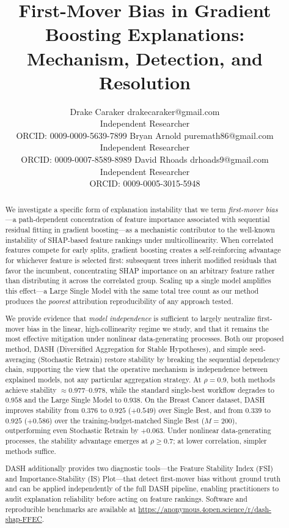 \documentclass[10pt]{article}
\title{First-Mover Bias in Gradient Boosting Explanations: Mechanism, Detection, and Resolution}
\author{\name Drake Caraker \email drakecaraker@gmail.com \\
      \addr Independent Researcher \\
      ORCID: 0009-0009-5639-7899
      \AND
      \name Bryan Arnold \email puremath86@gmail.com \\
      \addr Independent Researcher \\
      ORCID: 0009-0007-8589-8989
      \AND
      \name David Rhoads \email drhoads9@gmail.com \\
      \addr Independent Researcher \\
      ORCID: 0009-0005-3015-5948}
\newcommand{\dash}{\textsc{DASH}}
\newcommand{\rhovar}{\rho}
\begin{document}
\maketitle

\begin{abstract}
We investigate a specific form of explanation instability that we term
\emph{first-mover bias}---a path-dependent concentration of feature importance
associated with sequential residual fitting in gradient boosting---as a
mechanistic contributor to the well-known instability of SHAP-based feature
rankings under multicollinearity. When correlated features
compete for early splits, gradient boosting creates a self-reinforcing
advantage for whichever feature is selected first: subsequent trees inherit
modified residuals that favor the incumbent, concentrating SHAP importance on
an arbitrary feature rather than distributing it across the correlated group.
Scaling up a single model amplifies this effect---a Large Single Model with
the same total tree count as our method produces the \emph{poorest} attribution
reproducibility of any approach tested.

We provide evidence that \emph{model independence} is sufficient to largely
neutralize first-mover bias in the linear, high-collinearity regime we study,
and that it remains the most effective mitigation under nonlinear
data-generating processes. Both our proposed
method, \dash{} (Diversified Aggregation for Stable Hypotheses), and simple seed-averaging
(Stochastic Retrain) restore stability by breaking the sequential dependency
chain, supporting the view that the operative mechanism is independence between
explained models, not any particular aggregation strategy. At $\rhovar = 0.9$, both methods achieve stability
$\approx 0.977$--$0.978$, while the standard
single-best workflow degrades to $0.958$ and the Large Single Model to
$0.938$. On the Breast Cancer dataset, \dash{} improves stability from
$0.376$ to $0.925$ ($+0.549$) over Single Best, and from
$0.339$ to $0.925$ ($+0.586$) over the training-budget-matched
Single Best ($M{=}200$), outperforming even Stochastic Retrain by $+0.063$.
Under nonlinear data-generating processes, the stability advantage
emerges at $\rhovar \geq 0.7$; at lower correlation, simpler methods
suffice.

\dash{} additionally provides two diagnostic tools---the Feature
Stability Index (FSI) and Importance-Stability (IS) Plot---that detect
first-mover bias without ground truth and can be applied independently
of the full \dash{} pipeline, enabling practitioners to audit
explanation reliability before acting on feature rankings. Software and
reproducible benchmarks are available at
\url{https://anonymous.4open.science/r/dash-shap-FFEC}.
\end{abstract}
\end{document}
